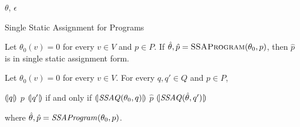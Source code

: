 \begin{algorithm}
  \begin{algorithmic}[1]
      \Case{$\epsilon$}
        \Return $\theta$, $\epsilon$
      \EndCase
      \EndCase
    \EndMatch
    \EndFunction
  \end{algorithmic}
  \caption{Single Static Assignment for Programs}
\end{algorithm}

\begin{theorem}
  Let $\theta_0(v) = 0$ for every $v \in V$ and $p \in P$.
  If $\hat{\theta}, \hat{p} = \textsc{SSAProgram}(\theta_0, p)$, then
  $\hat{p}$ is in single static assignment form.
\end{theorem}

\begin{theorem}
  Let $\theta_0(v) = 0$ for every $v \in V$. For every $q, q' \in Q$
  and $p \in P$,
  \begin{center}
    ${(\!|}{q}{|\!)}$ $p$ ${(\!|}{q'}{|\!)}$ if and only if
    ${(\!|}{\textmd{\textit{SSAQ}}(\theta_0, q)}{|\!)}$
    $\hat{p}$
    ${(\!|}{\textmd{\textit{SSAQ}}(\hat{\theta}, q')}{|\!)}$
  \end{center}
  where $\hat{\theta}, \hat{p} =
  \textmd{\textit{SSAProgram}}(\theta_0, p)$.
\end{theorem}